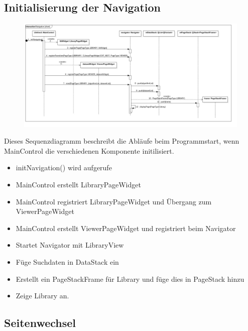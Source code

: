 \subsection{Initialisierung der Navigation}

\begin{figure}[H]
\centering
\includegraphics[width=\linewidth]{img/Sequenzdiagramme/Interaction}
\label{fig:Navigation init}
\end{figure}

Dieses Sequenzdiagramm beschreibt die Abläufe beim Programmstart, wenn MainControl die verschiedenen Komponente initilisiert.

\begin{itemize}
	\item initNavigation() wird aufgerufe

	\item MainControl erstellt LibraryPageWidget

	\item MainControl registriert LibraryPageWidget und Übergang zum ViewerPageWidget

	\item MainControl erstellt ViewerPageWidget und registriert beim Navigator

	\item Startet Navigator mit LibraryView

	\item Füge Suchdaten in DataStack ein

	\item Erstellt ein PageStackFrame für Library und füge dies in PageStack hinzu

	\item Zeige Library an.

\end{itemize}

\pagebreak

\subsection{Seitenwechsel}

